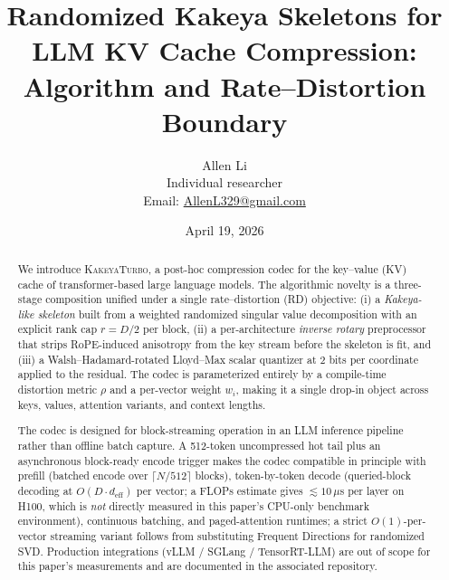 \documentclass[11pt,a4paper]{article}
\title{\textbf{Randomized Kakeya Skeletons for LLM KV Cache Compression:}\\
  \textbf{Algorithm and Rate--Distortion Boundary}}
\author{Allen Li \\[2pt]
  \small Individual researcher \\
  \small Email: \href{mailto:AllenL329@gmail.com}{AllenL329@gmail.com}}
\date{April 19, 2026}
\theoremstyle{definition}
\theoremstyle{plain}
\begin{document}
\maketitle

\begin{abstract}
We introduce \textsc{KakeyaTurbo}, a post-hoc compression codec for the key--value (KV) cache of transformer-based large language models. The algorithmic novelty is a three-stage composition unified under a single rate--distortion (RD) objective: (i) a \emph{Kakeya-like skeleton} built from a weighted randomized singular value decomposition with an explicit rank cap $r = D/2$ per block, (ii) a per-architecture \emph{inverse rotary} preprocessor that strips RoPE-induced anisotropy from the key stream before the skeleton is fit, and (iii) a Walsh--Hadamard-rotated Lloyd--Max scalar quantizer at $2$ bits per coordinate applied to the residual. The codec is parameterized entirely by a compile-time distortion metric $\rho$ and a per-vector weight $w_i$, making it a single drop-in object across keys, values, attention variants, and context lengths.

The codec is designed for block-streaming operation in an LLM inference pipeline rather than offline batch capture. A 512-token uncompressed hot tail plus an asynchronous block-ready encode trigger makes the codec compatible in principle with prefill (batched encode over $\lceil N / 512 \rceil$ blocks), token-by-token decode (queried-block decoding at $O(D \cdot d_{\text{eff}})$ per vector; a FLOPs estimate gives $\lesssim 10\,\mu$s per layer on H100, which is \emph{not} directly measured in this paper's CPU-only benchmark environment), continuous batching, and paged-attention runtimes; a strict $O(1)$-per-vector streaming variant follows from substituting Frequent Directions for randomized SVD. Production integrations (vLLM / SGLang / TensorRT-LLM) are out of scope for this paper's measurements and are documented in the associated repository.


\end{abstract}
\end{document}
